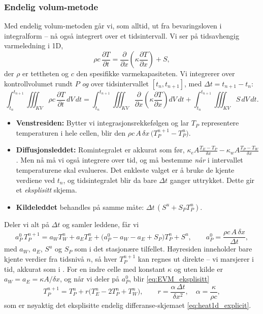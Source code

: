 \subsubsection*{Endelig volum-metode}
Med endelig volum-metoden går vi, som alltid, ut fra bevaringsloven i integralform -- nå også integrert over et tidsintervall. Vi ser på tidsavhengig varmeledning i 1D,
\begin{equation}\label{eq:EVM_tid1D}
\rho c\,\frac{\partial T}{\partial t} = \frac{\partial}{\partial x}\left(\kappa\frac{\partial T}{\partial x}\right) + S,
\end{equation}
der $\rho$ er tettheten og $c$ den spesifikke varmekapasiteten. Vi integrerer over kontrollvolumet rundt $P$ \emph{og} over tidsintervallet $[t_n, t_{n+1}]$, med $\Delta t = t_{n+1}-t_n$:
\[
\int_{t_n}^{t_{n+1}}\!\!\iiint_{KV} \rho c\,\frac{\partial T}{\partial t}\,dV\,dt
= \int_{t_n}^{t_{n+1}}\!\!\iiint_{KV} \frac{\partial}{\partial x}\left(\kappa\frac{\partial T}{\partial x}\right)dV\,dt + \int_{t_n}^{t_{n+1}}\!\!\iiint_{KV} S\,dV\,dt .
\]
\begin{itemize}
\item \textbf{Venstresiden:} Bytter vi integrasjonsrekkefølgen og lar $T_P$ representere temperaturen i hele cellen, blir den $\rho c\,A\,\delta x\,\big(T_P^{n+1}-T_P^n\big)$.
\item \textbf{Diffusjonsleddet:} Romintegralet er akkurat som før, $\kappa_eA\frac{T_E-T_P}{\delta x}-\kappa_wA\frac{T_P-T_W}{\delta x}$. Men nå må vi også integrere over tid, og må bestemme \emph{når} i intervallet temperaturene skal evalueres. Det enkleste valget er å bruke de kjente verdiene ved $t_n$, og tidsintegralet blir da bare $\Delta t$ ganger uttrykket. Dette gir et \emph{eksplisitt} skjema.
\item \textbf{Kildeleddet} behandles på samme måte: $\Delta t\,(S^u+S_PT_P^n)$.
\end{itemize}
Deler vi alt på $\Delta t$ og samler leddene, får vi
\begin{equation}\label{eq:EVM_eksplisitt}
a_P^0\,T_P^{n+1} = a_W T_W^n + a_E T_E^n + \big(a_P^0 - a_W - a_E + S_P\big)T_P^n + S^u,
\qquad a_P^0 = \frac{\rho c\,A\,\delta x}{\Delta t},
\end{equation}
med $a_W$, $a_E$, $S^u$ og $S_P$ som i det stasjonære tilfellet. Høyresiden inneholder bare kjente verdier fra tidsnivå $n$, så hver $T_P^{n+1}$ kan regnes ut direkte -- vi marsjerer i tid, akkurat som i . For en indre celle med konstant $\kappa$ og uten kilde er $a_W=a_E=\kappa A/\delta x$, og når vi deler på $a_P^0$, blir \eqref{eq:EVM_eksplisitt}
\[
T_P^{n+1} = T_P^n + r\big(T_E^n - 2T_P^n + T_W^n\big), \qquad r = \frac{\alpha\,\Delta t}{\delta x^2}, \quad \alpha = \frac{\kappa}{\rho c},
\]
som er nøyaktig det eksplisitte endelig differanse-skjemaet \eqref{eq:heat1d_explicit}.

